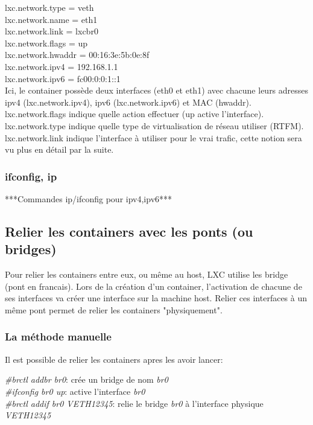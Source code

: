 \documentclass{article}
\begin{document}
\noindent
lxc.network.type = veth\\
lxc.network.name = eth1\\
lxc.network.link = lxcbr0\\
lxc.network.flags = up\\
lxc.network.hwaddr = 00:16:3e:5b:0e:8f\\
lxc.network.ipv4 = 192.168.1.1\\
lxc.network.ipv6 = fc00:0:0:1::1\\

Ici, le container poss\`ede deux interfaces (eth0 et eth1) avec chacune leurs adresses ipv4 (lxc.network.ipv4),
ipv6 (lxc.network.ipv6) et MAC (hwaddr).\\
lxc.network.flags indique quelle action effectuer (up active l'interface).\\
lxc.network.type indique quelle type de virtualisation de réseau utiliser (RTFM).\\
lxc.network.link indique l'interface \`a utiliser pour le vrai trafic, cette notion sera vu plus en d\'etail par la suite.\\

\subsubsection{ifconfig, ip}

***Commandes ip/ifconfig pour ipv4,ipv6***

\subsection{Relier les containers avec les ponts (ou bridges)}

Pour relier les containers entre eux, ou m\^eme au host, LXC utilise les bridge (pont en francais). Lors de
la cr\'eation d'un container, l'activation de chacune de ses interfaces va cr\'eer une interface sur la machine
host. Relier ces interfaces \`a un m\^eme pont permet de relier les containers "physiquement".

\subsubsection{La m\'ethode manuelle}

Il est possible de relier les containers apres les avoir lancer:

\noindent
\emph{\#brctl addbr br0}: cr\'ee un bridge de nom \emph{br0}\\
\emph{\#ifconfig br0 up}: active l'interface \emph{br0}\\
\emph{\#brctl addif br0 VETH12345}: relie le bridge \emph{br0} \`a l'interface physique \emph{VETH12345}\\
\end{document}
